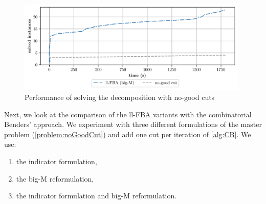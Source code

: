 \begin{figure}[h!]
    \centering
    \includegraphics[width=0.983\textwidth]{Images/no_good_cuts_comparison_plot.pdf}
    \caption{Performance of solving the decomposition with no-good cuts}
    \label{fig:no_good_cuts_comparison_plot}
\end{figure}

Next, we look at the comparison of the ll-FBA variants with the combinatorial Benders' approach. We experiment with three different formulations of the master problem (\cref{problem:noGoodCut}) and add one cut per iteration of \cref{alg:CB}. We use:
\begin{enumerate}
    \item the indicator formulation, 
    \item the big-M reformulation,
    \item the indicator formulation and big-M reformulation.
\end{enumerate}

